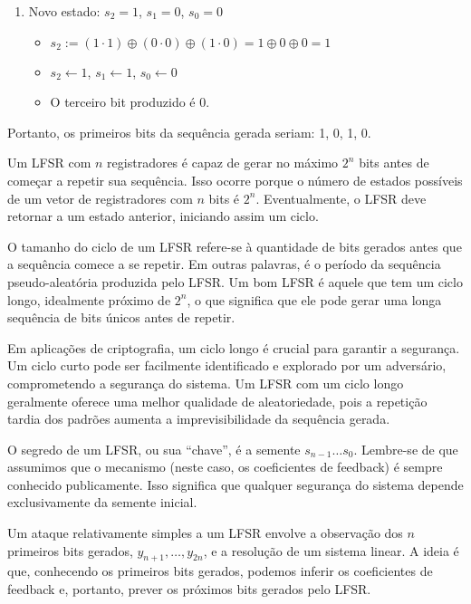 \begin{example}
\begin{enumerate}
    \item Novo estado: $s_2 = 1$, $s_1 = 0$, $s_0 = 0$
    \begin{itemize}
        \item $s_2 := (1 \cdot 1) \oplus (0 \cdot 0) \oplus (1 \cdot 0) = 1 \oplus 0 \oplus 0 = 1$
        \item $s_2 \leftarrow 1$, $s_1 \leftarrow 1$, $s_0 \leftarrow 0$
        \item O terceiro bit produzido é 0.
    \end{itemize}
\end{enumerate}

Portanto, os primeiros bits da sequência gerada seriam: 1, 0, 1, 0.

\end{example}

Um LFSR com $n$ registradores é capaz de gerar no máximo $2^n$ bits antes de começar a repetir sua sequência.
Isso ocorre porque o número de estados possíveis de um vetor de registradores com $n$ bits é $2^n$.
Eventualmente, o LFSR deve retornar a um estado anterior, iniciando assim um ciclo.

O tamanho do ciclo de um LFSR refere-se à quantidade de bits gerados antes que a sequência comece a se repetir.
Em outras palavras, é o período da sequência pseudo-aleatória produzida pelo LFSR.
Um bom LFSR é aquele que tem um ciclo longo, idealmente próximo de $2^n$, o que significa que ele pode gerar uma longa sequência de bits únicos antes de repetir.

Em aplicações de criptografia, um ciclo longo é crucial para garantir a segurança.
Um ciclo curto pode ser facilmente identificado e explorado por um adversário, comprometendo a segurança do sistema.
Um LFSR com um ciclo longo geralmente oferece uma melhor qualidade de aleatoriedade, pois a repetição tardia dos padrões aumenta a imprevisibilidade da sequência gerada.


O segredo de um LFSR, ou sua ``chave'', é a semente $s_{n-1} \dots s_0$.
Lembre-se de que assumimos que o mecanismo (neste caso, os coeficientes de feedback) é sempre conhecido publicamente. Isso significa que qualquer segurança do sistema depende exclusivamente da semente inicial.

Um ataque relativamente simples a um LFSR envolve a observação dos $n$ primeiros bits gerados, \(y_{n+1}, \dots, y_{2n}\), e a resolução de um sistema linear.
A ideia é que, conhecendo os primeiros bits gerados, podemos inferir os coeficientes de feedback e, portanto, prever os próximos bits gerados pelo LFSR.

